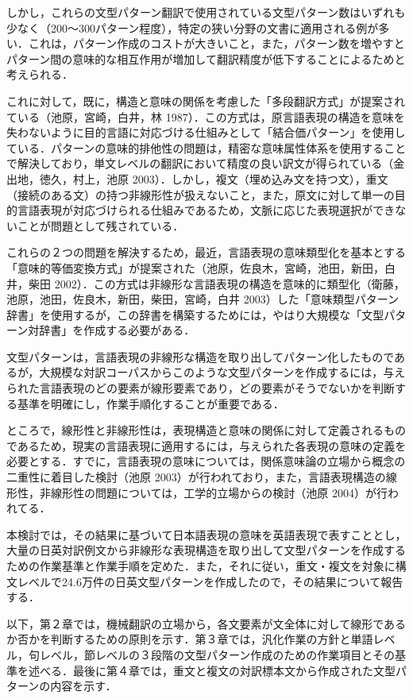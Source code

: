 \documentclass{nlp}
\begin{document}
しかし，これらの文型パターン翻訳で使用されている文型パターン数はいずれも少なく（200〜300パターン程度），特定の狭い分野の文書に適用される例が多い．これは，パターン作成のコストが大きいこと，また，パターン数を増やすとパターン間の意味的な相互作用が増加して翻訳精度が低下することによるためと考えられる．

これに対して，既に，構造と意味の関係を考慮した「多段翻訳方式」が提案されている（池原，宮崎，白井，林 1987）．この方式は，原言語表現の構造を意味を失わないように目的言語に対応づける仕組みとして「結合価パターン」を使用している．パターンの意味的排他性の問題は，精密な意味属性体系を使用することで解決しており，単文レベルの翻訳において精度の良い訳文が得られている（金出地，徳久，村上，池原 2003）．しかし，複文（埋め込み文を持つ文），重文（接続のある文）の持つ非線形性が扱えないこと，また，原文に対して単一の目的言語表現が対応づけられる仕組みであるため，文脈に応じた表現選択ができないことが問題として残されている．

これらの２つの問題を解決するため，最近，言語表現の意味類型化を基本とする「意味的等価変換方式」が提案された（池原，佐良木，宮崎，池田，新田，白井，柴田 2002）．この方式は非線形な言語表現の構造を意味的に類型化（衛藤，池原，池田，佐良木，新田，柴田，宮崎，白井 2003）した「意味類型パターン辞書」を使用するが，この辞書を構築するためには，やはり大規模な「文型パターン対辞書」を作成する必要がある．

文型パターンは，言語表現の非線形な構造を取り出してパターン化したものであるが，大規模な対訳コーパスからこのような文型パターンを作成するには，与えられた言語表現のどの要素が線形要素であり，どの要素がそうでないかを判断する基準を明確にし，作業手順化することが重要である．

ところで，線形性と非線形性は，表現構造と意味の関係に対して定義されるものであるため，現実の言語表現に適用するには，与えられた各表現の意味の定義を必要とする．すでに，言語表現の意味については，関係意味論の立場から概念の二重性に着目した検討（池原 2003）が行われており，また，言語表現構造の線形性，非線形性の問題については，工学的立場からの検討（池原 2004）が行われてる．

本検討では，その結果に基づいて日本語表現の意味を英語表現で表すこととし，大量の日英対訳例文から非線形な表現構造を取り出して文型パターンを作成するための作業基準と作業手順を定めた．また，それに従い，重文・複文を対象に構文レベルで24.6万件の日英文型パターンを作成したので，その結果について報告する．

以下，第２章では，機械翻訳の立場から，各文要素が文全体に対して線形であるか否かを判断するための原則を示す．第３章では，汎化作業の方針と単語レベル，句レベル，節レベルの３段階の文型パターン作成のための作業項目とその基準を述べる．最後に第４章では，重文と複文の対訳標本文から作成された文型パターンの内容を示す．
\end{document}
